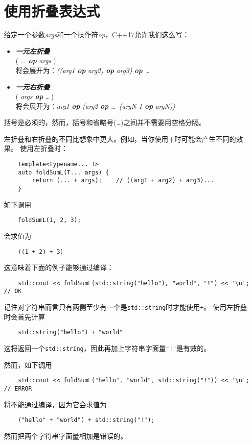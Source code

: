 \section{使用折叠表达式}\label{ch11.2}
给定一个参数\emph{args}和一个操作符\emph{op}，C++17允许我们这么写：
\begin{itemize}
    \item \emph{\textbf{一元左折叠}}\\
    \hspace*{2em}( \ldots \, \emph{\textbf{op} args} )\\
    将会展开为：\emph{((arg1 \textbf{op} arg2) \textbf{op} arg3) \textbf{op} \ldots}
    \item \emph{\textbf{一元右折叠}}\\
    \hspace*{2em}( \emph{args \textbf{op}} \ldots \,)\\
    将会展开为：\emph{arg1 \textbf{op} (arg2 \textbf{op} \ldots \, (argN-1 \textbf{op} argN))}
\end{itemize}
括号是必须的，然而，括号和省略号(\ldots)之间并不需要用空格分隔。

左折叠和右折叠的不同比想象中更大。例如，当你使用\textbf{+}时可能会产生不同的效果。
使用左折叠时：
\begin{lstlisting}
    template<typename... T>
    auto foldSumL(T... args) {
        return (... + args);    // ((arg1 + arg2) + arg3)...
    }
\end{lstlisting}
如下调用
\begin{lstlisting}
    foldSumL(1, 2, 3);
\end{lstlisting}
会求值为
\begin{lstlisting}
    ((1 + 2) + 3)
\end{lstlisting}
这意味着下面的例子能够通过编译：
\begin{lstlisting}
    std::cout << foldSumL(std::string("hello"), "world", "!") << '\n';  // OK
\end{lstlisting}
记住对字符串而言只有两侧至少有一个是\texttt{std::string}时才能使用\texttt{+}。
使用左折叠时会首先计算
\begin{lstlisting}
    std::string("hello") + "world"
\end{lstlisting}
这将返回一个\texttt{std::string}，因此再加上字符串字面量\texttt{"!"}是有效的。

然而，如下调用
\begin{lstlisting}
    std::cout << foldSumL("hello", "world", std::string("!")) << '\n';  // ERROR
\end{lstlisting}
将不能通过编译，因为它会求值为
\begin{lstlisting}
    ("hello" + "world") + std::string("!");
\end{lstlisting}
然而把两个字符串字面量相加是错误的。

